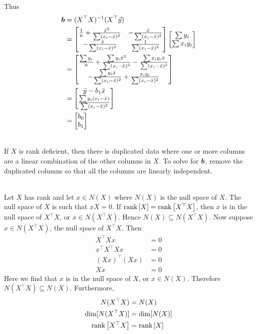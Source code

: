 \documentclass[12pt]{article}
\begin{document}
\begin{enumerate}
Thus $$ \begin{aligned} \boldsymbol{b} &= (X^\top X)^{-1} (X^\top \vec{y}) \\ &= \begin{bmatrix} \frac{1}{n} + \frac{\bar{x}^2}{\sum (x_i - \bar{x})^2} & -\frac{\bar{x}}{\sum (x_i - \bar{x})^2} \\ -\frac{\bar{x}}{\sum (x_i - \bar{x})^2} & \frac{1}{\sum (x_i - \bar{x})^2} \end{bmatrix} \begin{bmatrix} \sum y_i \\ \sum x_iy_i \end{bmatrix} \\ &= \begin{bmatrix} \frac{\sum y_i}{n} + \frac{\sum y_i \bar{x}^2}{\sum (x_i - \bar{x})^2} - \frac{ \sum x_iy_i\bar{x}}{\sum (x_i - \bar{x})^2} \\ -\frac{\sum y_i \bar{x}}{\sum (x_i - \bar{x})^2} + \frac{x_iy_i}{\sum (x_i - \bar{x})^2} \end{bmatrix} \\ &= \begin{bmatrix} \bar{y} - b_1\bar{x} \\ \frac{\sum y_i(x_i - \bar{x})}{\sum (x_i - \bar{x})^2} \end{bmatrix} \\ &= \begin{bmatrix} b_0 \\ b_1 \end{bmatrix} \end{aligned} $$ 


  \\
If $X$ is rank deficient, then there is duplicated data where one or more columns are a linear combination of the other columns in $X$. To solve for $\boldsymbol{b}$, remove the duplicated columns so that all the columns are linearly independent. 

 \\
Let $X$ has rank and let $x \in N(X)$ where $N(X)$ is the null space of $X$. The null space of $X$ is such that $xX = 0$. If $\text{rank}\left[X\right] = \text{rank}\left[X^\top X\right]$, then $x$ is in the null space of $X^\top X$, or $x \in N(X^\top X)$. Hence $N(X) \subseteq N(X^\top X)$. Now suppose $x \in N(X^\top X)$, the null space of $X^\top X$. Then $$ \begin{aligned} X^\top Xx &= 0 \\ x^\top X^\top Xx &= 0 \\ (Xx)^\top (Xx) &= 0 \\ Xx &= 0 \end{aligned} $$ Here we find that $x$ is in the null space of $X$, or $x \in N(X)$. Therefore $N(X^\top X) \subseteq N(X)$. Furthermore, $$ \begin{aligned} N(X^\top X) &= N(X) \\ \dim[N(X^\top X)] &= \dim[N(X)] \\ \text{rank}\left[X^\top X\right] &= \text{rank}\left[X\right] \end{aligned} $$ 


\end{enumerate}
\end{document}
